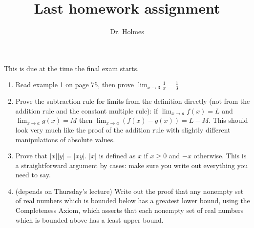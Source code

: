\documentclass[12pt]{article}
\title{Last homework assignment}
\author{Dr. Holmes}
\begin{document}
\maketitle

This is due at the time the final exam starts.

\begin{enumerate}

\item  Read example 1 on page 75, then prove $\lim_{x \rightarrow 3} \frac1x = \frac13$

\item Prove the subtraction rule for limits from the definition directly (not from the addition rule and the constant multiple rule):  if $\lim_{x \rightarrow a}f(x) = L$
and $\lim_{x \rightarrow a}g(x) = M$ then $\lim_{x \rightarrow a}(f(x)-g(x)) = L - M$.  This should look very much like the proof of the addition rule with slightly different manipulations of absolute values.

\item Prove that $|x||y| = |xy|$.  $|x|$ is defined as $x$ if $x \geq 0$ and $-x$ otherwise.  This is a straightforward argument by cases:  make sure you write out everything you need to say.

\item (depends on Thursday's lecture)  Write out the proof that any nonempty set of real numbers which is bounded below has a greatest lower bound,
using the Completeness Axiom, which asserts that each nonempty set of real numbers which is bounded above has a least upper bound.


\end{enumerate}
\end{document}
